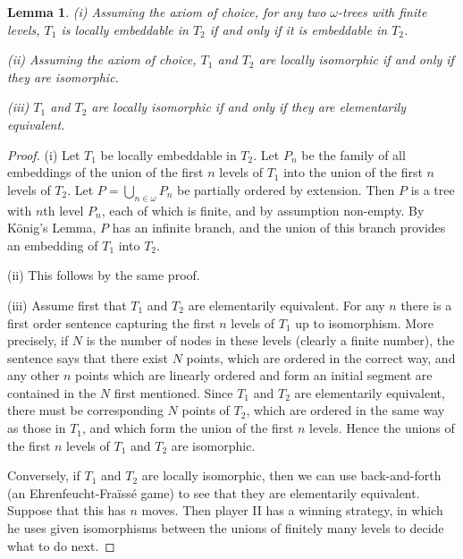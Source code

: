 \documentclass[10pt,a4paper]{amsart}
\newtheorem{lemma}[theorem]{Lemma}
\begin{document}
\begin{lemma} (i) Assuming the axiom of choice, for any two $\omega$-trees with finite levels, $T_1$ 
is locally embeddable in $T_2$ if and only if it is embeddable in $T_2$.

(ii) Assuming the axiom of choice, $T_1$ and $T_2$ are locally isomorphic if and only if they
are isomorphic.

(iii) $T_1$ and $T_2$ are locally isomorphic if and only if they are elementarily equivalent. \label{4.4}  \end{lemma}

\begin{proof}  
(i) Let $T_1$ be locally embeddable in $T_2$. Let $P_n$ be the family of all embeddings of the union of the
first $n$ levels of $T_1$ into the union of the first $n$ levels of $T_2$. Let $P = \bigcup_{n \in \omega}P_n$
be partially ordered by extension. Then $P$ is a tree with $n$th level $P_n$, each of which is finite, and by
assumption non-empty. By K\"onig's Lemma, $P$ has an infinite branch, and the union of this branch provides an
embedding of $T_1$ into $T_2$.

(ii) This follows by the same proof. 

(iii) Assume first that $T_1$ and $T_2$ are elementarily equivalent. For any $n$ there is a first order sentence
capturing the first $n$ levels of $T_1$ up to isomorphism. More precisely, if $N$ is the number of nodes in these
levels (clearly a finite number), the sentence says that there exist $N$ points, which are ordered in the
correct way, and any other $n$ points which are linearly ordered and form an initial segment are contained in
the $N$ first mentioned. Since $T_1$ and $T_2$ are elementarily equivalent, there must be corresponding $N$ points
of $T_2$, which are ordered in the same way as those in $T_1$, and which form the union of the first $n$ levels.
Hence the unions of the first $n$ levels of $T_1$ and $T_2$ are isomorphic.

Conversely, if $T_1$ and $T_2$ are locally isomorphic, then we can use back-and-forth (an
Ehrenfeucht-Fra\"iss\'e game) to see that they are elementarily equivalent. Suppose that this has $n$
moves. Then player II has a winning strategy, in which he uses given isomorphisms between the unions of
finitely many levels to decide what to do next.          \end{proof}
\end{document}
